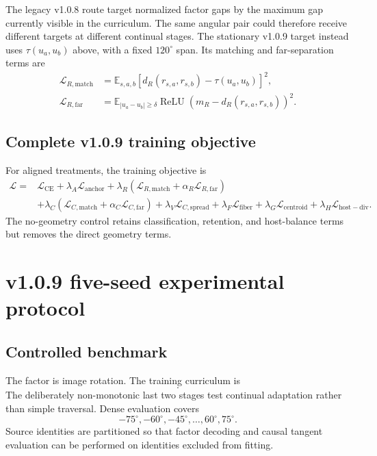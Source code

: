 \documentclass[11pt,a4paper]{article}
\newcommand{\E}{\mathbb{E}}
\newcommand{\loss}{\mathcal{L}}
\newcommand{\relu}{\operatorname{ReLU}}
\begin{document}
The legacy v1.0.8 route target normalized factor gaps by the maximum gap currently visible in the curriculum. The same angular pair could therefore receive different targets at different continual stages. The stationary v1.0.9 target instead uses $\tau(u_a,u_b)$ above, with a fixed $120^\circ$ span. Its matching and far-separation terms are
\begin{align}
 \loss_{R,\mathrm{match}}
 &=\E_{s,a,b}\left[d_R(r_{s,a},r_{s,b})-\tau(u_a,u_b)\right]^2,\\
 \loss_{R,\mathrm{far}}
 &=\E_{|u_a-u_b|\geq\delta}
 \relu\left(m_R-d_R(r_{s,a},r_{s,b})\right)^2.
\end{align}

\subsection{Complete v1.0.9 training objective}

For aligned treatments, the training objective is
\begin{equation}
\begin{split}
 \loss ={}& \loss_{\mathrm{CE}}
 +\lambda_A\loss_{\mathrm{anchor}}
 +\lambda_R(\loss_{R,\mathrm{match}}+\alpha_R\loss_{R,\mathrm{far}})\\
 &+\lambda_C(\loss_{C,\mathrm{match}}+\alpha_C\loss_{C,\mathrm{far}})
 +\lambda_V\loss_{C,\mathrm{spread}}
 +\lambda_F\loss_{\mathrm{fiber}}
 +\lambda_G\loss_{\mathrm{centroid}}
 +\lambda_H\loss_{\mathrm{host-div}}.
\end{split}
\end{equation}
The no-geometry control retains classification, retention, and host-balance terms but removes the direct geometry terms.

\section{v1.0.9 five-seed experimental protocol}

\subsection{Controlled benchmark}

The factor is image rotation. The training curriculum is
\begin{equation}
 [-60^\circ,-30^\circ,0^\circ,60^\circ,30^\circ].
\end{equation}
The deliberately non-monotonic last two stages test continual adaptation rather than simple traversal. Dense evaluation covers
\begin{equation}
 -75^\circ,-60^\circ,-45^\circ,\ldots,60^\circ,75^\circ.
\end{equation}
Source identities are partitioned so that factor decoding and causal tangent evaluation can be performed on identities excluded from fitting.
\end{document}
